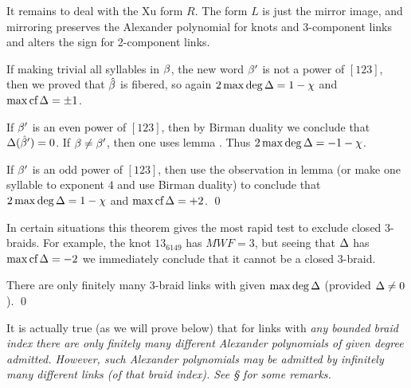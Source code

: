 It remains to deal with the Xu form $R$. The form $L$ is just the
mirror image, and mirroring preserves the Alexander polynomial for
knots and 3-component links and alters the sign for 2-component
links.

If making trivial all syllables in $\beta$, the new word
$\beta'$ is not a power of $[123]$, then we proved that $\hat{\beta}$
is fibered, so again $2\max\deg\Delta=1-\chi$ and $\max\text{\rm cf}\,\Delta=\pm 1$.

If $\beta'$ is an even power of $[123]$, then by Birman duality we
conclude that $\Delta(\hat{\beta}')=0$. If $\beta\ne \beta'$, then one uses
lemma .
Thus $2\max\deg\Delta=-1-\chi$.

If $\beta'$ is an odd power of $[123]$, then use the observation in
lemma   (or make one syllable to exponent $4$ and
use Birman duality) to conclude that $2\max\deg\Delta=1-\chi$ and
$\max\text{\rm cf}\,\Delta=+2$. \qed

\begin{exam}
In certain situations this theorem gives the most rapid test to
exclude closed 3-braids. For example, the knot $13_{6149}$ has
$MWF=3$, but seeing that $\Delta$ has $\max\text{\rm cf}\,\Delta=-2$ we immediately
conclude that it cannot be a closed 3-braid.
\end{exam}

\begin{corr}
There are only finitely many 3-braid links with given $\max\deg\Delta$
(provided $\Delta\ne 0$). \qed
\end{corr}

It is actually true (as we will prove below) that for links with
\em{any} bounded braid index there are only finitely many different
Alexander polynomials of given degree admitted. However, such
Alexander polynomials may be admitted by infinitely many different
links (of that braid index). See \S{} for some remarks.
% 

